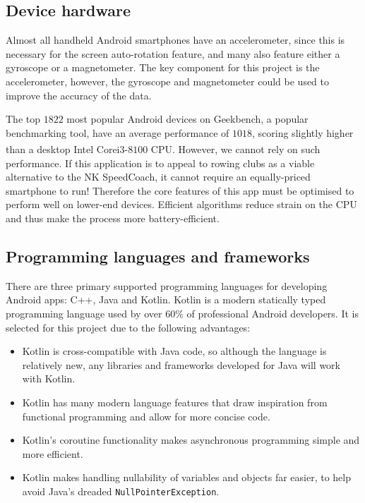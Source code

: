 \documentclass[11pt,twoside,a4paper]{report}
\begin{document}
\subsection{Device hardware}

Almost all handheld Android smartphones have an accelerometer, since this is necessary for the screen auto-rotation feature, and many also feature either a gyroscope or a magnetometer.\cite{android_motion_sensors} 
The key component for this project is the accelerometer, however, the gyroscope and magnetometer could be used to improve the accuracy of the data.

The top $1822$ most popular Android devices on Geekbench, a popular benchmarking tool, have an average performance of $1018$, scoring slightly higher than a desktop Intel\textsuperscript{\textregistered} Core\texttrademark i$3$-$8100$ CPU. \cite{android_benchmarks} However, we cannot rely on such performance. If this application is to appeal to rowing clubs as a viable alternative to the NK SpeedCoach, it cannot require an equally-priced smartphone to run! Therefore the core features of this app must be optimised to perform well on lower-end devices.
Efficient algorithms reduce strain on the CPU and thus make the process more battery-efficient.

\subsection{Programming languages and frameworks}

There are three primary supported programming languages for developing Android apps: C++, Java and Kotlin. Kotlin is a modern statically typed programming language used by over $60\%$ of professional Android developers. It is selected for this project due to the following advantages: 
\begin{itemize}
  \item Kotlin is cross-compatible with Java code, so although the language is relatively new, any libraries and frameworks developed for Java will work with Kotlin.
  \item Kotlin has many modern language features that draw inspiration from functional programming and allow for more concise code.
  \item Kotlin's coroutine functionality makes asynchronous programming simple and more efficient.
  \item Kotlin makes handling nullability of variables and objects far easier, to help avoid Java's dreaded \texttt{NullPointerException}. 
\end{itemize}
\end{document}
